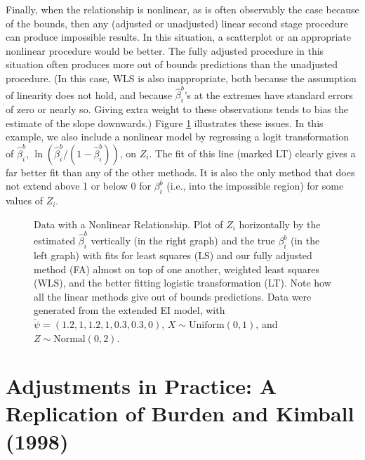 \documentclass[11pt,titlepage]{article}
\begin{document}
Finally, when the relationship is nonlinear, as is often observably
the case because of the bounds, then any (adjusted or unadjusted)
linear second stage procedure can produce impossible results.  In this
situation, a scatterplot or an appropriate nonlinear procedure would
be better.  The fully adjusted procedure in this situation often
produces more out of bounds predictions than the unadjusted procedure.
(In this case, WLS is also inappropriate, both because the assumption
of linearity does not hold, and because $\hat\beta_i^b$'s at the
extremes have standard errors of zero or nearly so.  Giving extra
weight to these observations tends to bias the estimate of the slope
downwards.)  Figure \ref{f:nonlinear} illustrates these issues.  In
this example, we also include a nonlinear model by regressing a logit
transformation of $\hat\beta_i^b$,
$\ln(\hat\beta_i^b/(1-\hat\beta_i^b))$, on $Z_i$.  The fit of this
line (marked LT) clearly gives a far better fit than any of the other
methods.  It is also the only method that does not extend above 1 or
below 0 for $\beta_i^b$ (i.e., into the impossible region) for some
values of $Z_i$.
\begin{figure}[t]
  \begin{center}
    \caption{Data with a Nonlinear Relationship.  Plot of $Z_i$ 
      horizontally by the estimated $\hat\beta_i^b$ vertically (in the
      right graph) and the true $\beta_i^b$ (in the left graph) with
      fits for least squares (LS) and our fully adjusted method (FA)
      almost on top of one another, weighted least squares (WLS), and
      the better fitting logistic transformation (LT).  Note how all
      the linear methods give out of bounds predictions.  Data were
      generated from the extended EI model, with
      $\breve\psi=(1.2,1,1.2,1,0.3,0.3,0)$, $X \sim \textrm{Uniform}(0,1)$, and
      $Z \sim \textrm{Normal}(0,2)$.}
    \label{f:nonlinear}
  \end{center}
\end{figure}

\section{Adjustments in Practice: A Replication of Burden and Kimball (1998)}
\end{document}

